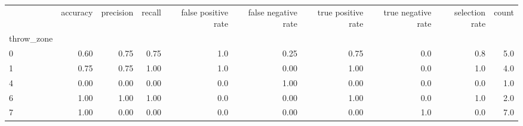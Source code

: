 \begin{tabular}{lrrrrrrrrr}
\toprule
{} &  accuracy &  precision &  recall &  false positive rate &  false negative rate &  true positive rate &  true negative rate &  selection rate &  count \\
throw\_zone &           &            &         &                      &                      &                     &                     &                 &        \\
\midrule
0          &      0.60 &       0.75 &    0.75 &                  1.0 &                 0.25 &                0.75 &                 0.0 &             0.8 &    5.0 \\
1          &      0.75 &       0.75 &    1.00 &                  1.0 &                 0.00 &                1.00 &                 0.0 &             1.0 &    4.0 \\
4          &      0.00 &       0.00 &    0.00 &                  0.0 &                 1.00 &                0.00 &                 0.0 &             0.0 &    1.0 \\
6          &      1.00 &       1.00 &    1.00 &                  0.0 &                 0.00 &                1.00 &                 0.0 &             1.0 &    2.0 \\
7          &      1.00 &       0.00 &    0.00 &                  0.0 &                 0.00 &                0.00 &                 1.0 &             0.0 &    7.0 \\
\bottomrule
\end{tabular}
